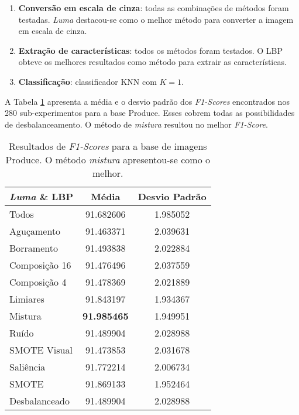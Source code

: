 \begin{enumerate}
\item \textbf{Conversão em escala de cinza}: todas as combinações de métodos foram testadas. \emph{Luma} destacou-se como o melhor método para converter a imagem em escala de cinza.
\item \textbf{Extração de características}: todos os métodos foram testados. O LBP obteve os melhores resultados como método para extrair as características.
\item \textbf{Classificação}: classificador KNN com $K=1$.
\end{enumerate}


A Tabela \ref{tab:resultados:3.3} apresenta a média e o desvio padrão dos \textit{F1-Scores} encontrados nos 280 sub-experimentos para a base Produce. Esses cobrem todas as possibilidades de desbalanceamento. O método de \emph{mistura} resultou no melhor \textit{F1-Score}.

\begin{table}[!htbp]
\begin{center}
\caption{Resultados de \textit{F1-Scores} para a base de imagens Produce. O método \emph{mistura} apresentou-se como o melhor.}
\label{tab:resultados:3.3}
\begin{tabular}{|l|c|c|}
\hline
\textbf{\emph{Luma} \& LBP} & \textbf{Média}     & \textbf{Desvio Padrão} \\ \hline
   Todos        &  91.682606 &  1.985052  \\ \hline
  Aguçamento    &  91.463371 &  2.039631  \\ \hline
  Borramento    &  91.493838 &  2.022884  \\ \hline
  Composição 16 &  91.476496 &  2.037559  \\ \hline
  Composição 4  &  91.478369 &  2.021889  \\ \hline
  Limiares      &  91.843197 &  1.934367  \\ \hline
  Mistura       &  \textbf{91.985465} &  1.949951  \\ \hline
  Ruído         &  91.489904 &  2.028988  \\ \hline
  SMOTE Visual  &  91.473853 &  2.031678  \\ \hline
  Saliência     &  91.772214 &  2.006734  \\ \hline
 SMOTE          &  91.869133 &  1.952464  \\ \hline
Desbalanceado   &  91.489904 &  2.028988  \\ \hline
\end{tabular}
\end{center}
\end{table}

